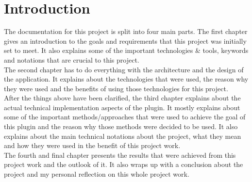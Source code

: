 \chapter{Introduction}
The documentation for this project is split into four main parts. 
The first chapter gives an introduction to the goals and requirements that this project was initially set to meet. It also explains some of the important technologies \& tools, keywords and notations that are crucial to this project.\\
\newline
The second chapter has to do everything with the architecture and the design of the application. It explains about the technologies that were used, the reason why they were used and the benefits of using those technologies for this project.\\
\newline
After the things above have been clarified, the third chapter explains about the actual technical implementation aspects of the plugin. It mostly explains about some of the important methods/approaches that were used to achieve the goal of this plugin and the reason why those methods were decided to be used. It also explains about the main technical notations about the project, what they mean and how they were used in the benefit of this project work.\\
\newline
The fourth and final chapter presents the results that were achieved from this project work and the outlook of it. It also wraps up with a conclusion about the project and my personal reflection on this whole project work.
\newpage

